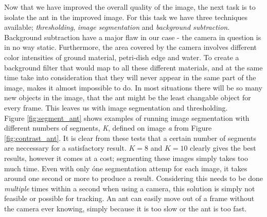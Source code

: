 Now that we have improved the overall quality of the image, the next task is to isolate the ant in the improved image. For this task we have three techniques available; \emph{thresholding}, \emph{image segmentation} and \emph{background subtraction}. Background subtraction have a major flaw in our case - the camera in question is in no way static. Furthermore, the area covered by the camera involves different color intensities of ground material, petri-dish edge and water. To create a background filter that would map to all these different materials, and at the same time take into consideration that they will never appear in the same part of the image, makes it almost impossible to do. In most situations there will be so many new objects in the image, that the ant might be the least changable object for every frame. This leaves us with image segmentation and thresholding.\\

Figure \ref{fig:segment_ant} shows examples of running image segmentation with different numbers of segments, \textit{K}, defined on image \emph{a} from Figure \ref{fig:contrast_ant}. It is clear from these tests that a certain number of segments are neccessary for a satisfactory result. $K=8$ and $K=10$ clearly gives the best results, however it comes at a cost; segmenting these images simply takes too much time. Even with only óne segmentation attemp for each image, it takes around one second or more to produce a result. Considering this needs to be done \emph{multiple} times within a second when using a camera, this solution is simply not feasible or possible for tracking. An ant can easily move out of a frame without the camera ever knowing, simply because it is too slow or the ant is too fast.\\

